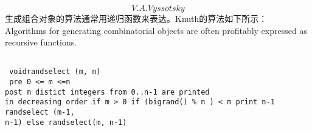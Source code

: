 \documentclass[nofonts,UTF8]{article}
\begin{document}
\rmfamily
\[V.A. Vyssotsky\]生成组合对象的算法通常用递归函数来表达。Knuth的算法如下所示：
Algorithms for generating combinatorial objects are often profitably
expressed as recursive functions.

\begin{lstlisting}

 voidrandselect (m, n)
 pre 0 <= m <=n 
post m distict integers from 0..n-1 are printed
in decreasing order if m > 0 if (bigrand() % n ) < m print n-1 randselect (m-1,
n-1) else randselect(m, n-1)
\end{lstlisting}
\end{document}
